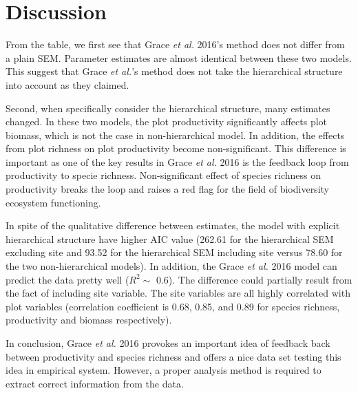 \documentclass{article}
\begin{document}
\section{Discussion}

From the table, we first see that Grace \textit{et al.} 2016's method does not differ from a plain SEM. Parameter estimates are almost identical between these two models. This suggest that Grace \textit{et al.}'s method does not take the hierarchical structure into account as they claimed. 

Second, when specifically consider the hierarchical structure, many estimates changed. In these two models, the plot productivity significantly affects plot biomass, which is not the case in non-hierarchical model. In addition, the effects from plot richness on plot productivity become non-significant. This difference is important as one of the key results in Grace \textit{et al.} 2016 is the feedback loop from productivity to specie richness. Non-significant effect of species richness on productivity breaks the loop and raises a red flag for the field of biodiversity ecosystem functioning. 

In spite of the qualitative difference between estimates, the model with explicit hierarchical structure have higher AIC value (262.61 for the hierarchical SEM excluding site and 93.52 for the hierarchical SEM including site versus 78.60 for the two non-hierarchical models). In addition, the Grace \textit{et al.} 2016 model can predict the data pretty well ($R^2 \sim$  0.6). The difference could partially result from the fact of including site variable. The site variables are all highly correlated with plot variables (correlation coefficient is 0.68, 0.85, and 0.89 for species richness, productivity and biomass respectively). 

In conclusion, Grace \textit{et al.} 2016 provokes an important idea of feedback back between productivity and species richness and offers a nice data set testing this idea in empirical system. However, a proper analysis method is required to extract correct information from the data. 



\end{document}
